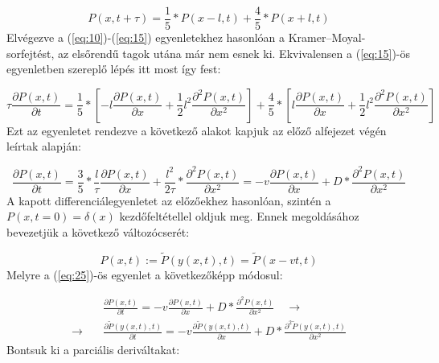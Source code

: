 \begin{equation} \label{eq:23}
    P \left( x, t + \tau \right)
    =
    \frac{1}{5} * P \left( x - l, t \right) + \frac{4}{5} * P \left( x + l, t \right)
\end{equation}
Elvégezve a (\ref{eq:10})-(\ref{eq:15}) egyenletekhez hasonlóan a Kramer--Moyal-sorfejtést, az elsőrendű tagok utána már nem esnek ki. Ekvivalensen a (\ref{eq:15})-ös egyenletben szereplő lépés itt most így fest:

\begin{equation} \label{eq:24}
    \tau \frac{\partial P \left( x, t \right)}{\partial t}
    =
    \frac{1}{5} * \left[ -l \frac{\partial P \left( x, t \right)}{\partial x} + \frac{1}{2} l^{2} \frac{\partial^{2} P \left( x, t \right)}{\partial x^{2}} \right] + \frac{4}{5} * \left[ l \frac{\partial P \left( x, t \right)}{\partial x} + \frac{1}{2} l^{2} \frac{\partial^{2} P \left( x, t \right)}{\partial x^{2}} \right]
\end{equation}
Ezt az egyenletet rendezve a következő alakot kapjuk az előző alfejezet végén leírtak alapján:

\begin{equation} \label{eq:25}
    \frac{\partial P \left( x, t \right)}{\partial t}
    =
    \frac{3}{5} * \frac{l}{\tau} \frac{\partial P \left( x, t \right)}{\partial x} + \frac{l^{2}}{2 \tau} * \frac{\partial^{2} P \left( x, t \right)}{\partial x^{2}}
    =
    - v \frac{\partial P \left( x, t \right)}{\partial x} + D * \frac{\partial^{2} P \left( x, t \right)}{\partial x^{2}}
\end{equation}
A kapott differenciálegyenletet az előzőekhez hasonlóan, szintén a $P \left( x, t=0 \right) = \delta \left( x \right)$ kezdőfeltétellel oldjuk meg. Ennek megoldásához bevezetjük a következő változócserét:

\begin{equation*}
    P \left( x, t \right)
    :=
    \tilde{P} \left( y \left( x, t \right), t \right)
    =
    \tilde{P} \left( x - vt, t \right)
\end{equation*}
Melyre a (\ref{eq:25})-ös egyenlet a következőképp módosul:

\begin{align} \label{eq:26}
    &\frac{\partial P \left( x, t \right)}{\partial t}
    =
    - v \frac{\partial P \left( x, t \right)}{\partial x} + D * \frac{\partial^{2} P \left( x, t \right)}{\partial x^{2}} \quad \to \nonumber \\
    \to \quad &
    \frac{\partial \tilde{P} \left( y \left( x, t \right), t \right)}{\partial t}
    =
    - v \frac{\partial \tilde{P} \left( y \left( x, t \right), t \right)}{\partial x} + D * \frac{\partial^{2} \tilde{P} \left( y \left( x, t \right), t \right)}{\partial x^{2}}
\end{align}
Bontsuk ki a parciális deriváltakat:

